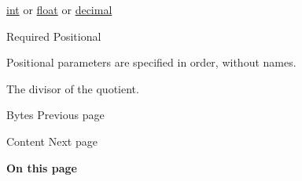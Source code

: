 \href{/docs/reference/foundations/int/}{int} {or}
\href{/docs/reference/foundations/float/}{float} {or}
\href{/docs/reference/foundations/decimal/}{decimal}

{Required} {{ Positional }}

\label{functions-quo-divisor-positional-tooltip}
Positional parameters are specified in order, without names.

The divisor of the quotient.

\href{/docs/reference/foundations/bytes/}{\pandocbounded{}}

{ Bytes } { Previous page }

\href{/docs/reference/foundations/content/}{\pandocbounded{}}

{ Content } { Next page }

\textbf{On this page}

